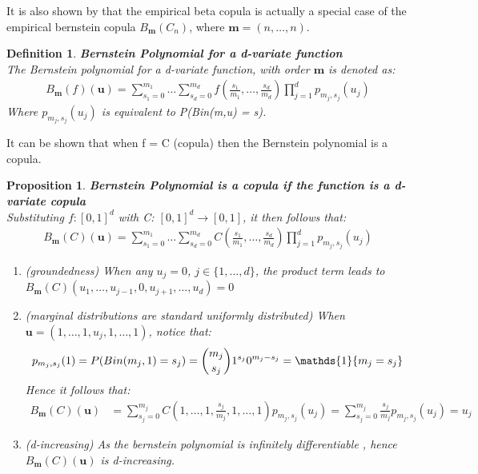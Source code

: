 \documentclass[12pt]{report}
\newtheorem{proposition}{Proposition}[section]
\newtheorem{definition}{Definition}[subsection]
\newcommand{\1}{\mathbf{1}}
\begin{document}
\begin{flushleft}
It is also shown by \cite{SegersEBC} that the empirical beta copula is actually a special case of the empirical bernstein copula $B_{\textbf{m}}(C_{n})$, where $\textbf{m} = (n, \dots, n)$.

\begin{definition}\label{BernsteinPolynomial}
\textit{\normalfont\parencite{SegersEBC}}\:
\textbf{Bernstein Polynomial for a d-variate function} \\
The Bernstein polynomial for a d-variate function, with order $\textbf{m}$ is denoted as:
\begin{align*}
B_{\textbf{m}}(f)(\textbf{u}) = \sum\limits_{s_{1} = 0}^{m_{1}} \dots \sum\limits_{s_{d} = 0}^{m_{d}} f \left(\frac{s_{1}}{m_{1}}, \dots, \frac{s_{d}}{m_{d}} \right) \prod\limits_{j = 1}^{d} p_{m_{j},s_{j}}(u_{j})
\end{align*}
Where $p_{m_{j},s_{j}}(u_{j})$ is equivalent to P(Bin(m,u) = s). \\ 
\end{definition}

It can be shown that when f = C (copula) then the Bernstein polynomial is a copula.

\begin{proposition}\label{BersteinPolynomialCopula}
\textit{\normalfont\parencite{SegersEBC}}\:
\textbf{Bernstein Polynomial is a copula if the function is a d-variate copula} \\
Substituting $f: [0,1]^{d}$ with C: $[0,1]^{d} \rightarrow [0,1]$, it then follows that:
\begin{align*}
B_{\textbf{m}}(C)(\textbf{u}) = \sum\limits_{s_{1} = 0}^{m_{1}} \dots \sum\limits_{s_{d} = 0}^{m_{d}} C \left(\frac{s_{1}}{m_{1}}, \dots, \frac{s_{d}}{m_{d}} \right) \prod\limits_{j = 1}^{d} p_{m_{j},s_{j}}(u_{j})
\end{align*}
\begin{enumerate}
\item (groundedness) When any $u_{j} = 0$, $j \in \{1, \dots, d\}$, the product term leads to $B_{\textbf{m}}(C)(u_{1}, \dots, u_{j-1}, 0, u_{j+1}, \dots, u_{d}) = 0$
\item (marginal distributions are standard uniformly distributed) When $\textbf{u} = (1, \dots, 1, u_{j}, 1, \dots, 1)$, notice that:
\begin{align*}
p_{m_{j},s_{j}}(1) = P(Bin(m_{j},1) = s_{j}) = \dbinom{m_{j}}{s_{j}} 1^{s_{j}} 0^{m_{j}-s_{j}} = \mathds{1}\{m_{j} = s_{j}\}
\end{align*}
Hence it follows that:
\begin{align*}
B_{\textbf{m}}(C)(\textbf{u}) &= \sum\limits_{s_{j} = 0}^{m_{j}} C(1, \dots, 1, \frac{s_{j}}{m_{j}}, 1, \dots, 1) p_{m_{j},s_{j}}(u_{j}) = \sum\limits_{s_{j} = 0}^{m_{j}} \frac{s_{j}}{m_{j}} p_{m_{j},s_{j}}(u_{j}) = u_{j}
\end{align*}
\item (d-increasing) As the bernstein polynomial is infinitely differentiable \parencite{SegersEBC}, hence $B_{\textbf{m}}(C)(\textbf{u})$ is d-increasing.
\end{enumerate}
\end{proposition}


\end{flushleft}
\end{document}
